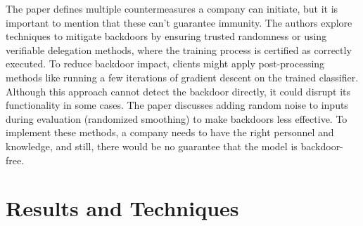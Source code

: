 \documentclass[
	fontsize=12pt,
	headings=small,
	parskip=quarter,
	bibliography=totoc,
	numbers=noenddot,       
	open=any,               
 	final                   
]{scrreprt}
\begin{document}
\par The paper defines multiple countermeasures a company can initiate, but it is important to mention that these can't guarantee immunity. The authors explore techniques to mitigate backdoors by ensuring trusted randomness or using verifiable delegation methods, where the training process is certified as correctly executed. To reduce backdoor impact, clients might apply post-processing methods like running a few iterations of gradient descent on the trained classifier. Although this approach cannot detect the backdoor directly, it could disrupt its functionality in some cases. The paper discusses adding random noise to inputs during evaluation (randomized smoothing) to make backdoors less effective. To implement these methods, a company needs to have the right personnel and knowledge, and still, there would be no guarantee that the model is backdoor-free.



{\let\clearpage\relax \chapter{Results and Techniques}}
\end{document}
